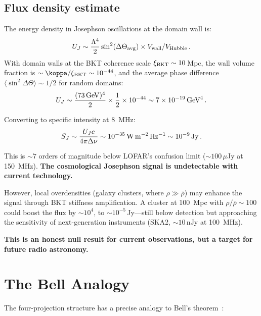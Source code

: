 \documentclass[twocolumn,preprintnumbers,amsmath,amssymb,prd]{revtex4-2}
\begin{document}
\subsection{Flux density estimate}

The energy density in Josephson oscillations at the domain wall is:
\begin{equation}
U_J \sim \frac{\Lambda^4}{2}\sin^2(\Delta\Theta_{\rm avg}) \times V_{\rm wall}/V_{\rm Hubble}\,.
\end{equation}
With domain walls at the BKT coherence scale $\xi_{\rm BKT} \sim 10\,$Mpc, the wall volume fraction is $\sim \koppa/\xi_{\rm BKT} \sim 10^{-44}$, and the average phase difference $\langle\sin^2\Delta\Theta\rangle \sim 1/2$ for random domains:
\begin{equation}
U_J \sim \frac{(73\,{\rm GeV})^4}{2} \times \frac{1}{2} \times 10^{-44} \sim 7\times10^{-19}\,{\rm GeV}^4\,.
\end{equation}

Converting to specific intensity at 8~MHz:
\begin{equation}
S_J \sim \frac{U_J c}{4\pi \Delta\nu} \sim 10^{-35}\,{\rm W\,m^{-2}\,Hz^{-1}} \sim 10^{-9}\,{\rm Jy}\,.
\end{equation}

This is $\sim 7$ orders of magnitude below LOFAR's confusion limit ($\sim 100\,\mu$Jy at 150~MHz). \textbf{The cosmological Josephson signal is undetectable with current technology.}

However, local overdensities (galaxy clusters, where $\rho \gg \bar{\rho}$) may enhance the signal through BKT stiffness amplification. A cluster at 100~Mpc with $\rho/\bar{\rho} \sim 100$ could boost the flux by $\sim 10^4$, to $\sim 10^{-5}\,$Jy---still below detection but approaching the sensitivity of next-generation instruments (SKA2, $\sim 10\,$nJy at 100~MHz).

\textbf{This is an honest null result for current observations, but a target for future radio astronomy.}

\section{The Bell Analogy}
\label{sec:bell}

The four-projection structure has a precise analogy to Bell's theorem~\cite{Bell1964}:
\end{document}
